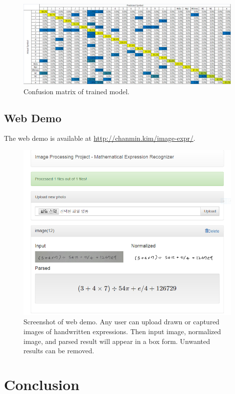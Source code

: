\documentclass[10pt,twocolumn,letterpaper]{article}
\begin{document}
\begin{figure}
\centering
\includegraphics[width=0.95\linewidth]{img/confusion_matrix.png}
\caption{Confusion matrix of trained model.}
\label{fig:confusion_matrix}
\end{figure}

\subsection{Web Demo}

The web demo is available at \url{http://chanmin.kim/image-expr/}.

\begin{figure}[ht]
\centering
\includegraphics[width=0.9\linewidth]{img/web_demo.png}
\caption{Screenshot of web demo.
Any user can upload drawn or captured images of handwritten expressions.
Then input image, normalized image, and parsed result will appear in a box form.
Unwanted results can be removed.}
\label{fig:thresholding}
\end{figure}

\section{Conclusion}
\end{document}
